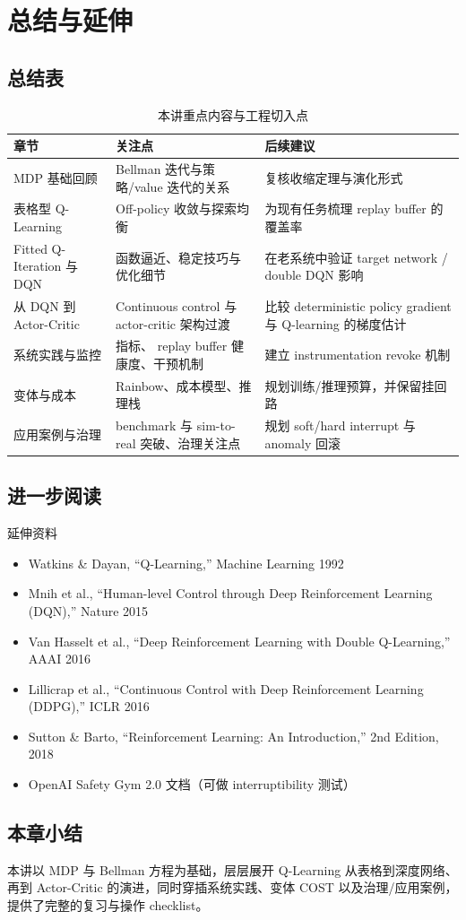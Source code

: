 \section{总结与延伸}

\subsection{总结表}

\begin{table}[H]
\centering
\begin{tabular}{lp{8cm}p{4cm}}
\toprule
章节 & 关注点 & 后续建议 \\
\midrule
MDP 基础回顾 & Bellman 迭代与策略/value 迭代的关系 & 复核收缩定理与演化形式 \\
表格型 Q-Learning & Off-policy 收敛与探索均衡 & 为现有任务梳理 replay buffer 的覆盖率 \\
Fitted Q-Iteration 与 DQN & 函数逼近、稳定技巧与优化细节 & 在老系统中验证 target network / double DQN 影响 \\
从 DQN 到 Actor-Critic & Continuous control 与 actor-critic 架构过渡 & 比较 deterministic policy gradient 与 Q-learning 的梯度估计 \\
系统实践与监控 & 指标、 replay buffer 健康度、干预机制 & 建立 instrumentation revoke 机制 \\
变体与成本 & Rainbow、成本模型、推理栈 & 规划训练/推理预算，并保留挂回路 \\
应用案例与治理 & benchmark 与 sim-to-real 突破、治理关注点 & 规划 soft/hard interrupt 与 anomaly 回滚 \\
\bottomrule
\end{tabular}
\caption{本讲重点内容与工程切入点}
\end{table}

\subsection{进一步阅读}

\begin{knowledgebox}{延伸资料}
\begin{itemize}
    \item Watkins \& Dayan, ``Q-Learning,'' Machine Learning 1992
    \item Mnih et al., ``Human-level Control through Deep Reinforcement Learning (DQN),'' Nature 2015
    \item Van Hasselt et al., ``Deep Reinforcement Learning with Double Q-Learning,'' AAAI 2016
    \item Lillicrap et al., ``Continuous Control with Deep Reinforcement Learning (DDPG),'' ICLR 2016
    \item Sutton \& Barto, ``Reinforcement Learning: An Introduction,'' 2nd Edition, 2018
    \item OpenAI Safety Gym 2.0 文档（可做 interruptibility 测试）
\end{itemize}
\end{knowledgebox}

\subsection{本章小结}

本讲以 MDP 与 Bellman 方程为基础，层层展开 Q-Learning 从表格到深度网络、再到 Actor-Critic 的演进，同时穿插系统实践、变体 COST 以及治理/应用案例，提供了完整的复习与操作 checklist。


